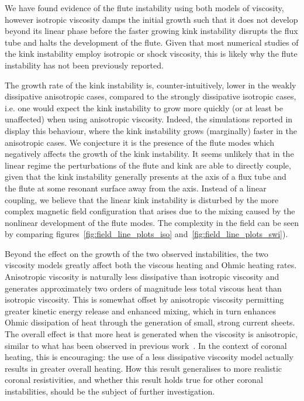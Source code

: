 \documentclass[fleqn,usenatbib]{mnras}
\newcommand{\rev}[1]{{\color{red} #1}}
\begin{document}
\rev{We have found evidence of the flute instability using both models of
viscosity, however isotropic viscosity damps the initial growth such that it
does not develop beyond its linear phase before the faster growing kink
instability disrupts the flux tube and halts the development of the flute.
Given that most numerical studies of the kink instability employ isotropic or
shock viscosity, this is likely why the flute instability has not been
previously reported.

The growth rate of the kink instability is, counter-intuitively, lower in the
weakly dissipative anisotropic cases, compared to the strongly dissipative
isotropic cases, i.e. one would expect the kink instability to grow more
quickly (or at least be unaffected) when using anisotropic viscosity. Indeed,
the simulations reported in~\citet{quinnEffectAnisotropicViscosity2020} display
this behaviour, where the kink instability grows (marginally) faster in the
anisotropic cases. We conjecture it is the presence of the flute modes which
negatively affects the growth of the kink instability. It seems unlikely that
in the linear regime the perturbations of the flute and kink are able to
directly couple, given that the kink instability generally presents at the axis
of a flux tube and the flute at some resonant surface away from the axis.
Instead of a linear coupling, we believe that the linear kink instability is
disturbed by the more complex magnetic field configuration that arises due to
the mixing caused by the nonlinear development of the flute modes. The
complexity in the field can be seen by comparing
figures~\ref{fig:field_line_plots_iso} and~\ref{fig:field_line_plots_swi}).

Beyond the effect on the growth of the two observed instabilities, the two
viscosity models greatly affect both the viscous heating and Ohmic heating
rates. Anisotropic viscosity is naturally less dissipative than isotropic
viscosity and generates approximately two orders of magnitude less total
viscous heat than isotropic viscosity. This is somewhat offset by anisotropic
viscosity permitting greater kinetic energy release and enhanced mixing, which
in turn enhances Ohmic dissipation of heat through the generation of small,
strong current sheets. The overall effect is that more heat is generated when
the viscosity is anisotropic, similar to what has been observed in previous
work~\citep{quinnEffectAnisotropicViscosity2020}. In the context of
coronal heating, this is encouraging: the use of a less dissipative viscosity
model actually results in greater overall heating. How this result generalises
to more realistic coronal resistivities, and whether this result holds true for
other coronal instabilities, should be the subject of further investigation.}
\end{document}
